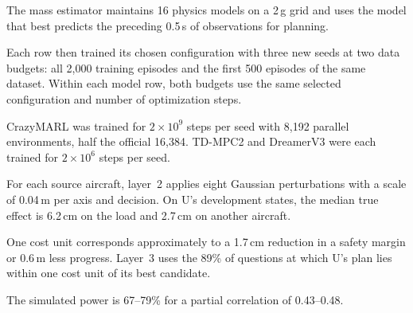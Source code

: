 
The mass estimator maintains 16 physics models on a 2\,g grid and uses the model that best predicts the preceding 0.5\,s of observations for planning.

Each row then trained its chosen configuration with three new seeds at two data budgets: all 2,000 training episodes and the first 500 episodes of the same dataset. Within each model row, both budgets use the same selected configuration and number of optimization steps.

CrazyMARL was trained for $2\times10^9$ steps per seed with 8,192 parallel environments, half the official 16,384. TD-MPC2 and DreamerV3 were each trained for $2\times10^6$ steps per seed.

For each source aircraft, layer~2 applies eight Gaussian perturbations with a scale of 0.04\,m per axis and decision. On U's development states, the median true effect is 6.2\,cm on the load and 2.7\,cm on another aircraft.

One cost unit corresponds approximately to a 1.7\,cm reduction in a safety margin or 0.6\,m less progress. Layer~3 uses the 89\% of questions at which U's plan lies within one cost unit of its best candidate.

The simulated power is 67--79\% for a partial correlation of 0.43--0.48.
